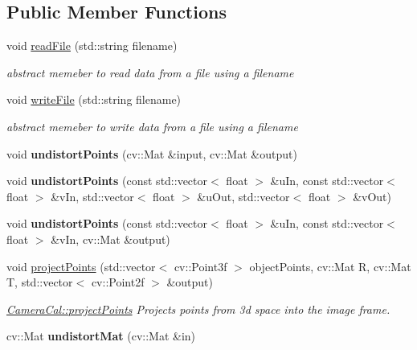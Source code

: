 \subsection*{Public Member Functions}
\begin{DoxyCompactItemize}
\item 
void \hyperlink{classCameraCal_a2f47fc4ab16adcdd6269184340e087ed}{read\+File} (std\+::string filename)
\begin{DoxyCompactList}\small\item\em abstract memeber to read data from a file using a filename \end{DoxyCompactList}\item 
void \hyperlink{classCameraCal_aed026a2f07ceffeaf5591072cae13f99}{write\+File} (std\+::string filename)
\begin{DoxyCompactList}\small\item\em abstract memeber to write data from a file using a filename \end{DoxyCompactList}\item 
void {\bfseries undistort\+Points} (cv\+::\+Mat \&input, cv\+::\+Mat \&output)\hypertarget{classCameraCal_a9190758a8a5759f1d6b312ad3d97a093}{}\label{classCameraCal_a9190758a8a5759f1d6b312ad3d97a093}

\item 
void {\bfseries undistort\+Points} (const std\+::vector$<$ float $>$ \&u\+In, const std\+::vector$<$ float $>$ \&v\+In, std\+::vector$<$ float $>$ \&u\+Out, std\+::vector$<$ float $>$ \&v\+Out)\hypertarget{classCameraCal_abdfe8dff383368dc307cac7428bc9ec3}{}\label{classCameraCal_abdfe8dff383368dc307cac7428bc9ec3}

\item 
void {\bfseries undistort\+Points} (const std\+::vector$<$ float $>$ \&u\+In, const std\+::vector$<$ float $>$ \&v\+In, cv\+::\+Mat \&output)\hypertarget{classCameraCal_afa30ca95ccf257c211274dc0ebc8d707}{}\label{classCameraCal_afa30ca95ccf257c211274dc0ebc8d707}

\item 
void \hyperlink{classCameraCal_aa1cc38014e07e74f9eaf139b72e55d09}{project\+Points} (std\+::vector$<$ cv\+::\+Point3f $>$ object\+Points, cv\+::\+Mat R, cv\+::\+Mat T, std\+::vector$<$ cv\+::\+Point2f $>$ \&output)
\begin{DoxyCompactList}\small\item\em \hyperlink{classCameraCal_aa1cc38014e07e74f9eaf139b72e55d09}{Camera\+Cal\+::project\+Points} Projects points from 3d space into the image frame. \end{DoxyCompactList}\item 
cv\+::\+Mat {\bfseries undistort\+Mat} (cv\+::\+Mat \&in)\hypertarget{classCameraCal_a61ac0d332a40375867c9f445e2bf62ce}{}\label{classCameraCal_a61ac0d332a40375867c9f445e2bf62ce}


\end{DoxyCompactItemize}
